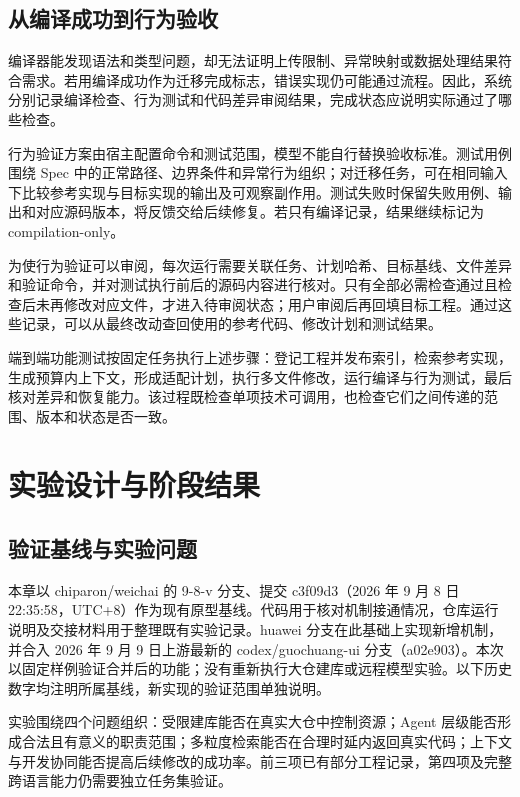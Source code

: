 \section{从编译成功到行为验收}

编译器能发现语法和类型问题，却无法证明上传限制、异常映射或数据处理结果符合需求。若用编译成功作为迁移完成标志，错误实现仍可能通过流程。因此，系统分别记录编译检查、行为测试和代码差异审阅结果，完成状态应说明实际通过了哪些检查。

行为验证方案由宿主配置命令和测试范围，模型不能自行替换验收标准。测试用例围绕 Spec 中的正常路径、边界条件和异常行为组织；对迁移任务，可在相同输入下比较参考实现与目标实现的输出及可观察副作用。测试失败时保留失败用例、输出和对应源码版本，将反馈交给后续修复。若只有编译记录，结果继续标记为 compilation-only。

为使行为验证可以审阅，每次运行需要关联任务、计划哈希、目标基线、文件差异和验证命令，并对测试执行前后的源码内容进行核对。只有全部必需检查通过且检查后未再修改对应文件，才进入待审阅状态；用户审阅后再回填目标工程。通过这些记录，可以从最终改动查回使用的参考代码、修改计划和测试结果。

端到端功能测试按固定任务执行上述步骤：登记工程并发布索引，检索参考实现，生成预算内上下文，形成适配计划，执行多文件修改，运行编译与行为测试，最后核对差异和恢复能力。该过程既检查单项技术可调用，也检查它们之间传递的范围、版本和状态是否一致。

\chapter{实验设计与阶段结果}
\label{chap:validation}

\section{验证基线与实验问题}

本章以 chiparon/weichai 的 9-8-v 分支、提交 c3f09d3（2026 年 9 月 8 日 22:35:58，UTC+8）作为现有原型基线。代码用于核对机制接通情况，仓库运行说明及交接材料用于整理既有实验记录。huawei 分支在此基础上实现新增机制，并合入 2026 年 9 月 9 日上游最新的 codex/guochuang-ui 分支（a02e903）。本次以固定样例验证合并后的功能；没有重新执行大仓建库或远程模型实验。以下历史数字均注明所属基线，新实现的验证范围单独说明。

实验围绕四个问题组织：受限建库能否在真实大仓中控制资源；Agent 层级能否形成合法且有意义的职责范围；多粒度检索能否在合理时延内返回真实代码；上下文与开发协同能否提高后续修改的成功率。前三项已有部分工程记录，第四项及完整跨语言能力仍需要独立任务集验证。

